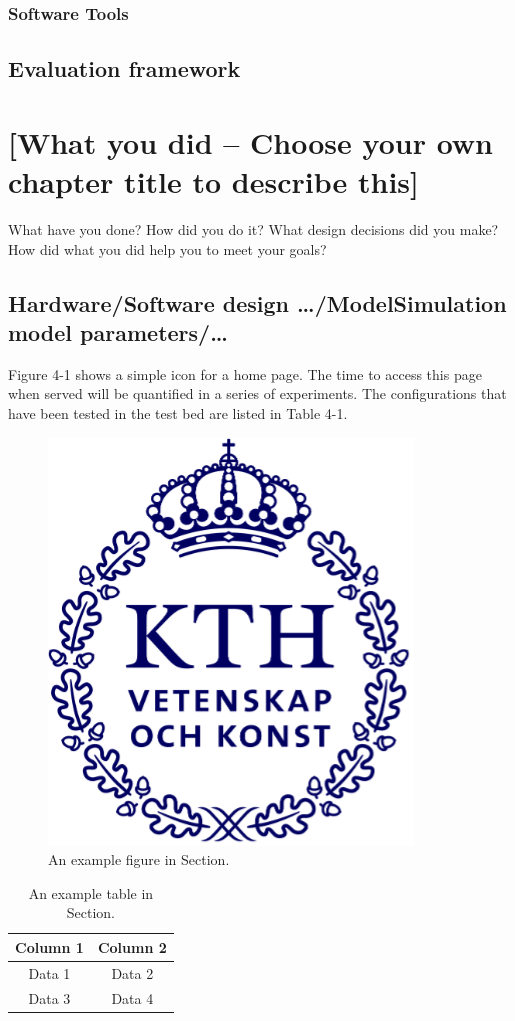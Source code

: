 \documentclass[a4paper,10pt,twocolumn]{article}
\numberwithin{figure}{section}
\numberwithin{table}{section}
\begin{document}
\subsubsection{Software Tools}


\subsection{Evaluation framework}




\section{[What you did – Choose your own chapter title to describe this]}
What have you done? How did you do it? What design decisions did you make? How did what you
did help you to meet your goals?

\subsection{Hardware/Software design …/ModelSimulation model parameters/…}
Figure 4-1 shows a simple icon for a home page. The time to access this page when served will be
quantified in a series of experiments. The configurations that have been tested in the test bed are
listed in Table 4-1.
\begin{figure}[htbp]
    \centering
    \includegraphics[width=0.4\linewidth]{kthLogga.png}  %
    \caption{An example figure in Section.}
    \label{fig:ldone}  
\end{figure}

\begin{table}[htbp]
    \centering
    \begin{tabular}{|c|c|}
        \hline
        Column 1 & Column 2 \\
        \hline
        Data 1 & Data 2 \\
        Data 3 & Data 4 \\
        \hline
    \end{tabular}
    \caption{An example table in Section.}
    \label{tab:done}  
\end{table}
\end{document}
